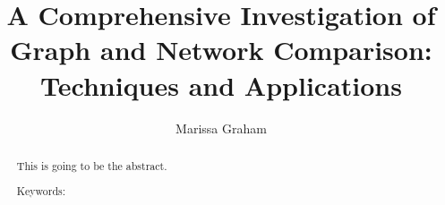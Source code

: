 \documentclass[12pt]{thesis}
\author{Marissa Graham}
\title{A Comprehensive Investigation of Graph and Network Comparison: Techniques and Applications}
\theoremstyle{plain}
\theoremstyle{definition}
\theoremstyle{remark}
\begin{document}








\frontmatter 
\maketitle 

\begin{abstract}
This is going to be the abstract.   
\vskip 3.25in
 
\noindent Keywords: %
\end{abstract}


\tableofcontents
\listoftables
\listoffigures
\mainmatter










\end{document}
